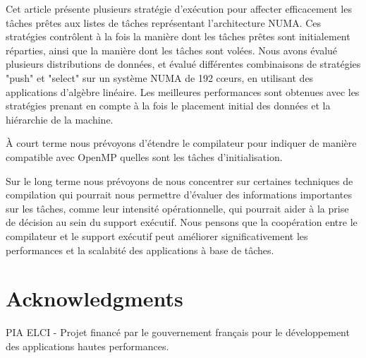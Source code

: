 \documentclass[parallelisme]{compas2016}
\begin{document}
Cet article présente plusieurs stratégie d'exécution pour affecter efficacement
les tâches prêtes aux listes de tâches représentant l'architecture NUMA.
Ces stratégies contrôlent à la fois la manière dont les tâches prêtes sont
initialement réparties, ainsi que la manière dont les tâches sont volées.
Nous avons évalué plusieurs distributions de données, et évalué différentes
combinaisons de stratégies "push" et "select" sur un système NUMA de 192 cœurs,
en utilisant des applications d'algèbre linéaire.
Les meilleures performances sont obtenues avec les stratégies prenant en compte à
la fois le placement initial des données et la hiérarchie de la machine.

À court terme nous prévoyons d'étendre le compilateur pour indiquer de manière
compatible avec OpenMP quelles sont les tâches d'initialisation.

Sur le long terme nous prévoyons de nous concentrer sur certaines techniques
de compilation qui pourrait nous permettre d'évaluer des informations
importantes sur les tâches, comme leur intensité opérationnelle, qui pourrait
aider à la prise de décision au sein du support exécutif. Nous pensons
que la coopération entre le compilateur et le support exécutif peut améliorer
significativement les performances et la scalabité des applications à base de tâches.

\vspace*{-2ex}
\section*{Acknowledgments}

PIA ELCI - Projet financé par le gouvernement français pour le développement
des applications hautes performances.


\end{document}
